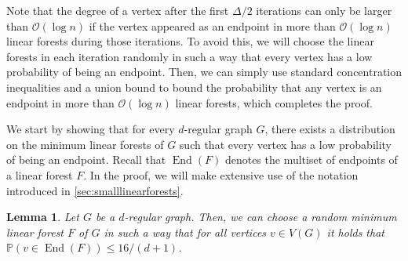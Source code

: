 \documentclass[11pt]{article}
\theoremstyle{plain}
\newtheorem{lemma}[theorem]{Lemma}
\theoremstyle{definition}
\newcommand{\pr}{\mathbb{P}}
\newcommand{\cO}{\mathcal O}
\DeclareMathOperator{\End}{End}
\begin{document}
Note that the degree of a vertex after the first $\Delta/2$ iterations can only be larger than $\cO(\log n)$ if the vertex appeared as an endpoint in more than $\cO(\log n)$ linear forests during those iterations. To avoid this, we will choose the linear forests in each iteration randomly in such a way that every vertex has a low probability of being an endpoint. Then, we can simply use standard concentration inequalities and a union bound to bound the probability that any vertex is an endpoint in more than $\cO(\log n)$ linear forests, which completes the proof.

We start by showing that for every $d$-regular graph $G$, there exists a distribution on the minimum linear forests of $G$ such that every vertex has a low probability of being an endpoint. Recall that $\End(F)$ denotes the multiset of endpoints of a linear forest $F$. In the proof, we will make extensive use of the notation introduced in \cref{sec:smalllinearforests}.

\begin{lemma}\label{lem:lowendpointprobability}
    Let $G$ be a $d$-regular graph. Then, we can choose a random minimum linear forest $F$ of $G$ in such a way that for all vertices $v \in V(G)$ it holds that $\pr(v \in \End(F)) \le 16/(d+1)$.
\end{lemma}
\end{document}
